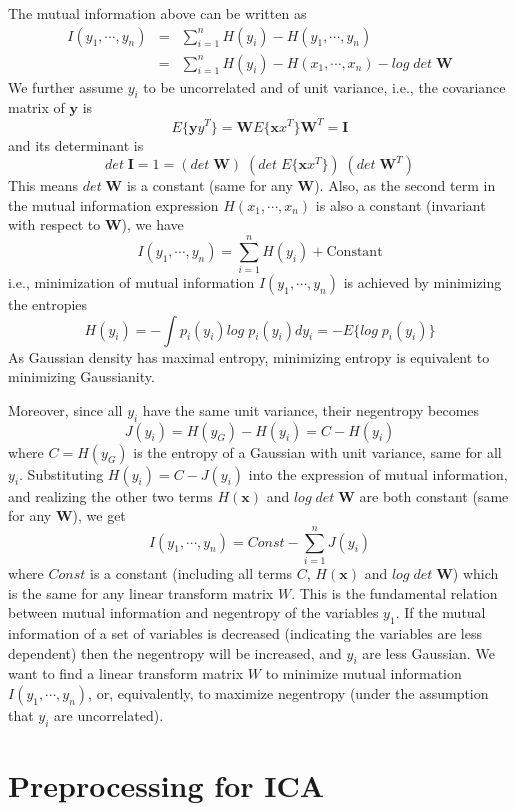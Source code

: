 The mutual information above can be written as
\begin{eqnarray}
I(y_1,\cdots,y_n)&=&\sum_{i=1}^n H(y_i)-H(y_1,\cdots,y_n)
	\nonumber \\
	&=&\sum_{i=1}^n H(y_i)-H(x_1,\cdots,x_n)-log\;det\; {\mathbf W}
	\nonumber
\end{eqnarray}
We further assume $y_i$ to be uncorrelated and of unit variance, i.e., the
covariance matrix of ${\mathbf y}$ is
\[
E\{{\mathbf yy^T}\}={\mathbf W}E\{{\mathbf xx^T}\}{\mathbf W^T}={\mathbf I}
\]
and its determinant is
\[	det\;{\mathbf I}=1=(det\;{\mathbf W})\;(det\;E\{{\mathbf xx}^T\})
	\;(det\;{\mathbf W}^T)	\]
This means $det\;{\mathbf W}$ is a constant (same for any ${\mathbf W}$). Also,
as the second term in the mutual information expression $H(x_1,\cdots,x_n)$ is
also a constant (invariant with respect to ${\mathbf W}$), we have
\[	I(y_1,\cdots,y_n)=\sum_{i=1}^n H(y_i)+\mbox{Constant}	\]
i.e., minimization of mutual information $I(y_1,\cdots,y_n)$ is achieved by
minimizing the entropies
\[	H(y_i)=-\int p_i(y_i) log\;p_i(y_i) dy_i=-E\{ log\;p_i(y_i) \}	\]
As Gaussian density has maximal entropy, minimizing entropy is equivalent to
minimizing Gaussianity.

Moreover, since all $y_i$ have the same unit variance, their negentropy becomes
\[	J(y_i)=H(y_G)-H(y_i)=C-H(y_i)	\]
where $C=H(y_G)$ is the entropy of a Gaussian with unit variance, same for
all $y_i$. Substituting $H(y_i)=C-J(y_i)$ into the expression of mutual
information, and realizing the other two terms $H({\mathbf x})$ and
$log\;det\;{\mathbf W}$ are both constant (same for any ${\mathbf W}$), we get
\[	I(y_1,\cdots,y_n)=Const-\sum_{i=1}^n J(y_i)	\]
where $Const$ is a constant (including all terms $C$, $H({\mathbf x})$ and
$log\;det\;{\mathbf W}$)
which is the same for any linear transform matrix $W$. This is the fundamental
relation between mutual information and negentropy of the variables $y_1$. If
the mutual information of a set of variables is decreased (indicating the
variables are less dependent) then the negentropy will be increased, and $y_i$
are less Gaussian. We want to find a linear transform matrix $W$ to minimize
mutual information $I(y_1,\cdots,y_n)$, or, equivalently, to maximize negentropy
(under the assumption that $y_i$ are uncorrelated).

\section*{Preprocessing for ICA}

